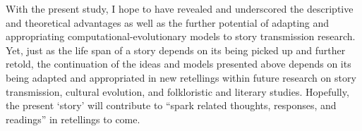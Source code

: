 With the present study, I hope to have revealed and underscored the descriptive and theoretical advantages as well as the further potential of adapting and appropriating computational-evolutionary models to story transmission research. Yet, just as the life span of a story depends on its being picked up and further retold, the continuation of the ideas and models presented above depends on its being adapted and appropriated in new retellings within future research on story transmission, cultural evolution, and folkloristic and literary studies. Hopefully, the present `story' will contribute to ``spark related thoughts, responses, and readings''\autocite[160]{sanders:2006} in retellings to come. 
